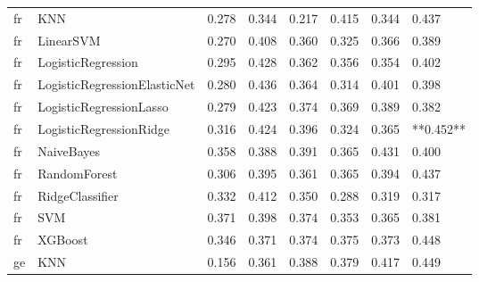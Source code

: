 \begin{tabular}{llllllll}
      fr &                          KNN & 0.278 &                     0.344 &                 0.217 &                  0.415 &                                   0.344 &     0.437 \\
      fr &                    LinearSVM & 0.270 &                     0.408 &                 0.360 &                  0.325 &                                   0.366 &     0.389 \\
      fr &           LogisticRegression & 0.295 &                     0.428 &                 0.362 &                  0.356 &                                   0.354 &     0.402 \\
      fr & LogisticRegressionElasticNet & 0.280 &                     0.436 &                 0.364 &                  0.314 &                                   0.401 &     0.398 \\
      fr &      LogisticRegressionLasso & 0.279 &                     0.423 &                 0.374 &                  0.369 &                                   0.389 &     0.382 \\
      fr &      LogisticRegressionRidge & 0.316 &                     0.424 &                 0.396 &                  0.324 &                                   0.365 & **0.452** \\
      fr &                   NaiveBayes & 0.358 &                     0.388 &                 0.391 &                  0.365 &                                   0.431 &     0.400 \\
      fr &                 RandomForest & 0.306 &                     0.395 &                 0.361 &                  0.365 &                                   0.394 &     0.437 \\
      fr &              RidgeClassifier & 0.332 &                     0.412 &                 0.350 &                  0.288 &                                   0.319 &     0.317 \\
      fr &                          SVM & 0.371 &                     0.398 &                 0.374 &                  0.353 &                                   0.365 &     0.381 \\
      fr &                      XGBoost & 0.346 &                     0.371 &                 0.374 &                  0.375 &                                   0.373 &     0.448 \\
      ge &                          KNN & 0.156 &                     0.361 &                 0.388 &                  0.379 &                                   0.417 &     0.449 \\

\end{tabular}
